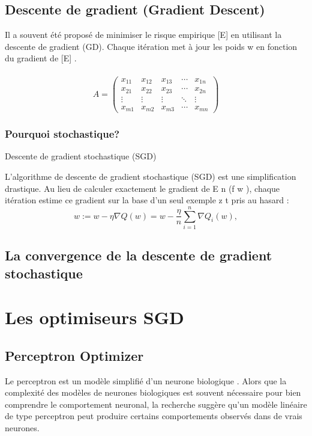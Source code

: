 	\subsection{Descente de gradient (Gradient Descent)}
	
	
	Il a souvent été proposé de minimiser le risque empirique [E] en utilisant la descente de gradient (GD). Chaque itération met à jour les poids w en fonction du gradient de [E] \cite{bottou2012stochastic}.\\
	
	\lipsum[1] \\ 
	
	$$A = \begin{pmatrix}
		x_{11} & x_{12} & x_{13} & \cdots & x_{1n} \\
		x_{21} & x_{22} & x_{23} & \cdots & x_{2n} \\
		\vdots & \vdots & \vdots & \ddots & \vdots \\
		x_{m1} & x_{m2} & x_{m3} & \cdots & x_{mn} 
	\end{pmatrix}$$
	
	
	\lipsum[4]
	\subsubsection{Pourquoi stochastique?}
	Descente de gradient stochastique (SGD) 
	
	L'algorithme de descente de gradient stochastique (SGD) est une simplification drastique. Au lieu de calculer exactement le gradient de E n (f w ), chaque itération estime ce gradient sur la base d'un seul exemple z t pris au hasard \cite{bottou2012stochastic} :
	$$
	{\displaystyle w:=w-\eta \nabla Q(w)=w-{\frac {\eta }{n}}\sum _{i=1}^{n}\nabla Q_{i}(w),}
	$$
	\lipsum[1]	
	\subsection{La convergence de la descente de gradient stochastique}
	\lipsum[1]	
	
	\section{Les optimiseurs SGD}
	\subsection{Perceptron Optimizer}
	
	Le perceptron est un modèle simplifié d'un neurone biologique . Alors que la complexité des modèles de neurones biologiques est souvent nécessaire pour bien comprendre le comportement neuronal, la recherche suggère qu'un modèle linéaire de type perceptron peut produire certains comportements observés dans de vrais neurones.
	
